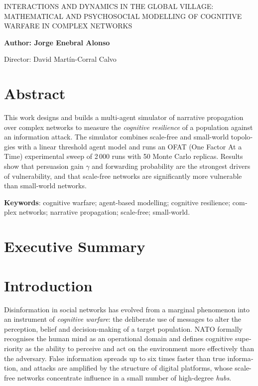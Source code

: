 \documentclass[12pt]{extarticle}
\numberwithin{equation}{section}
\newcommand{\projectTitleEnglish}{Interactions and Dynamics in the Global Village: Mathematical and Psychosocial Modelling of Cognitive Warfare in Complex Networks}
\newcommand{\Author}{Jorge Enebral Alonso}
\newcommand{\Director}{David Martín-Corral Calvo}
\newcommand{\sectionnotoc}[1]{%
    \refstepcounter{section}%
    \section*{\thesection\quad #1}%
}
\newcommand{\resetcounters}{
    \setcounter{section}{0}
    \setcounter{subsection}{0}
    \setcounter{subsubsection}{0}
    \setcounter{figure}{0}
    \setcounter{table}{0}
    \setcounter{equation}{0}
    \setcounter{footnote}{0}
}
\begin{document}

\newpage

\resetcounters

\begin{otherlanguage}{english}

{\large \MakeUppercase{\projectTitleEnglish}}
\vspace{3mm}

\textbf{Author: \Author}

Director: \Director

\section*{Abstract}

This work designs and builds a multi-agent simulator of narrative propagation over complex networks to measure the \emph{cognitive resilience} of a population against an information attack. The simulator combines scale-free and small-world topologies with a linear threshold agent model and runs an OFAT (One Factor At a Time) experimental sweep of 2\,000 runs with 50 Monte Carlo replicas. Results show that persuasion gain $\gamma$ and forwarding probability are the strongest drivers of vulnerability, and that scale-free networks are significantly more vulnerable than small-world networks.

\textbf{Keywords}: cognitive warfare; agent-based modelling; cognitive resilience; complex networks; narrative propagation; scale-free; small-world.

\section*{Executive Summary}

\sectionnotoc{Introduction}

Disinformation in social networks has evolved from a marginal phenomenon into an instrument of \emph{cognitive warfare}: the deliberate use of messages to alter the perception, belief and decision-making of a target population. NATO formally recognises the human mind as an operational domain and defines cognitive superiority as the ability to perceive and act on the environment more effectively than the adversary. False information spreads up to six times faster than true information, and attacks are amplified by the structure of digital platforms, whose scale-free networks concentrate influence in a small number of high-degree \emph{hubs}.


\end{otherlanguage}
\end{document}

